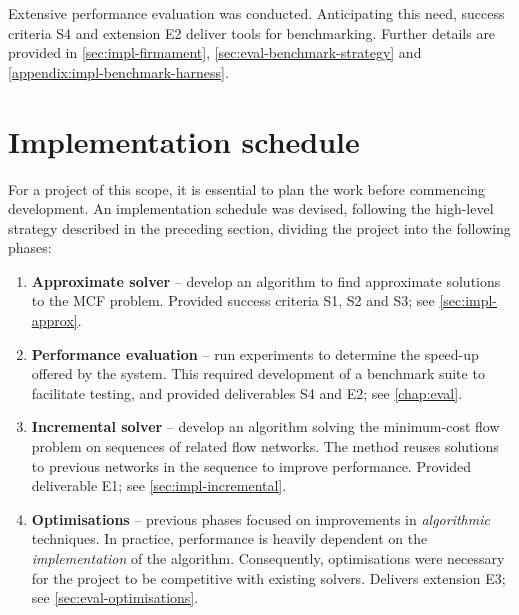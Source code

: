 Extensive performance evaluation was conducted. Anticipating this need, success criteria S4 and extension E2 deliver tools for benchmarking. Further details are provided in \cref{sec:impl-firmament}, \cref{sec:eval-benchmark-strategy} and \cref{appendix:impl-benchmark-harness}.

\section{Implementation schedule} \label{sec:prep-implsched}

%


For a project of this scope, it is essential to plan the work before commencing development. An implementation schedule was devised, following the high-level strategy described in the preceding section, dividing the project into the following phases:

\begin{enumerate}
    \item \label{itm:phase-approximate}
        \textbf{Approximate solver} -- develop an algorithm to find approximate solutions to the MCF problem. Provided success criteria S1, S2 and S3; see \cref{sec:impl-approx}.
    \item \label{itm:phase-evaluation} 
        \textbf{Performance evaluation} -- run experiments to determine the speed-up offered by the system. This required development of a benchmark suite to facilitate testing, and provided deliverables S4 and E2; see \cref{chap:eval}.
    \item \label{itm:phase-incremental} 
        \textbf{Incremental solver} -- develop an algorithm solving the minimum-cost flow problem on sequences of related flow networks. The method reuses solutions to previous networks in the sequence to improve performance. Provided deliverable E1; see \cref{sec:impl-incremental}.
    \item \label{itm:phase-optimisations}
        \textbf{Optimisations} -- previous phases focused on improvements in \emph{algorithmic} techniques. In practice, performance is heavily dependent on the \emph{implementation} of the algorithm. Consequently, optimisations were necessary for the project to be competitive with existing solvers. Delivers extension E3; see \cref{sec:eval-optimisations}.
\end{enumerate}

